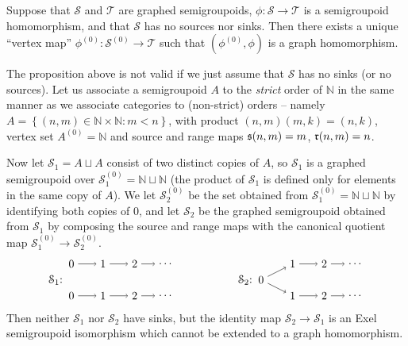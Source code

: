 \begin{corollary}\label{cor:graphedhomomorphisminducesvertexmap}
Suppose that $\mathcal{S}$ and $\mathcal{T}$ are graphed semigroupoids, $\phi\colon\mathcal{S}\to\mathcal{T}$ is a semigroupoid homomorphism, and that $\mathcal{S}$ has no sources nor sinks. Then there exists a unique ``vertex map'' $\phi^{(0)}\colon\mathcal{S}^{(0)}\to\mathcal{T}$ such that $(\phi^{(0)},\phi)$ is a graph homomorphism.
\end{corollary}

\begin{example}
The proposition above is not valid if we just assume that $\mathcal{S}$ has no sinks (or no sources). Let us associate a semigroupoid $A$ to the \emph{strict} order of $\mathbb{N}$ in the same manner as we associate categories to (non-strict) orders -- namely $A=\left\{(n,m)\in\mathbb{N}\times\mathbb{N}:m<n\right\}$, with product $(n,m)(m,k)=(n,k)$, vertex set $A^{(0)}=\mathbb{N}$ and source and range maps $\operatorname{\mathfrak{s}}(n,m)=m$, $\operatorname{\mathfrak{r}}(n,m)=n$.

Now let $\mathcal{S}_1=A\sqcup A$ consist of two distinct copies of $A$, so $\mathcal{S}_1$ is a graphed semigroupoid over $\mathcal{S}_1^{(0)}=\mathbb{N}\sqcup\mathbb{N}$ (the product of $\mathcal{S}_1$ is defined only for elements in the same copy of $A$). We let $\mathcal{S}_2^{(0)}$ be the set obtained from $\mathcal{S}_1^{(0)}=\mathbb{N}\sqcup\mathbb{N}$ by identifying both copies of $0$, and let $\mathcal{S}_2$ be the graphed semigroupoid obtained from $\mathcal{S}_1$ by composing the source and range maps with the canonical quotient map $\mathcal{S}_1^{(0)}\to\mathcal{S}_2^{(0)}$.
\[
\begin{tikzpicture}
\node (S2) at (0,0) {$\mathcal{S}_2$:};
\node (S20) at ([shift={+(0.5,0)}]S2) {$0$};
\node (S211) at ([shift={+(1,0.5)}]S20) {$1$};
\node (S212) at ([shift={+(1,-0.5)}]S20) {$1$};
\node (S221) at ([shift={+(1,0)}]S211) {$2$};
\node (S222) at ([shift={+(1,0)}]S212) {$2$};
\node (S231) at ([shift={+(1,0)}]S221) {$\cdots$};
\node (S232) at ([shift={+(1,0)}]S222) {$\cdots$};
\draw[->] (S20)--(S211);
\draw[->] (S211)--(S221);
\draw[->] (S221)--(S231);
\draw[->] (S20)--(S212);
\draw[->] (S212)--(S222);
\draw[->] (S222)--(S232);



\node (S1) at ([shift={+(-6,0)}]S2) {$\mathcal{S}_1$:};
\node (S101) at ([shift={+(0.5,0.5)}]S1) {$0$};
\node (S102) at ([shift={+(0.5,-0.5)}]S1) {$0$};
\node (S111) at ([shift={+(1,0)}]S101) {$1$};
\node (S112) at ([shift={+(1,0)}]S102) {$1$};
\node (S121) at ([shift={+(1,0)}]S111) {$2$};
\node (S122) at ([shift={+(1,0)}]S112) {$2$};
\node (S131) at ([shift={+(1,0)}]S121) {$\cdots$};
\node (S132) at ([shift={+(1,0)}]S122) {$\cdots$};
\draw[->] (S101)--(S111);
\draw[->] (S111)--(S121);
\draw[->] (S121)--(S131);
\draw[->] (S102)--(S112);
\draw[->] (S112)--(S122);
\draw[->] (S122)--(S132);
\end{tikzpicture}
\]
Then neither $\mathcal{S}_1$ nor $\mathcal{S}_2$ have sinks, but the identity map $\mathcal{S}_2\to\mathcal{S}_1$ is an Exel semigroupoid isomorphism which cannot be extended to a graph homomorphism.
\end{example}